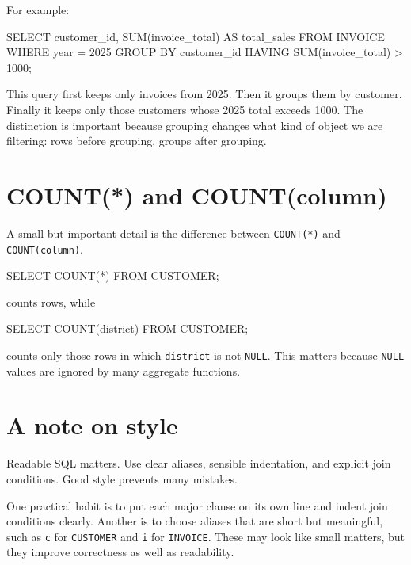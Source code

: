 \documentclass[11pt,a4paper,openany]{book}
\begin{document}
For example:

\begin{codesql}
SELECT customer_id, SUM(invoice_total) AS total_sales
FROM INVOICE
WHERE year = 2025
GROUP BY customer_id
HAVING SUM(invoice_total) > 1000;
\end{codesql}

This query first keeps only invoices from 2025. Then it groups them by customer. Finally it keeps only those customers whose 2025 total exceeds 1000. The distinction is important because grouping changes what kind of object we are filtering: rows before grouping, groups after grouping.

\section{COUNT(*) and COUNT(column)}
A small but important detail is the difference between \texttt{COUNT(*)} and \texttt{COUNT(column)}.

\begin{codesql}
SELECT COUNT(*)
FROM CUSTOMER;
\end{codesql}

counts rows, while

\begin{codesql}
SELECT COUNT(district)
FROM CUSTOMER;
\end{codesql}

counts only those rows in which \texttt{district} is not \texttt{NULL}. This matters because \texttt{NULL} values are ignored by many aggregate functions.

\section{A note on style}
Readable SQL matters. Use clear aliases, sensible indentation, and explicit join conditions. Good style prevents many mistakes.

One practical habit is to put each major clause on its own line and indent join conditions clearly. Another is to choose aliases that are short but meaningful, such as \texttt{c} for \texttt{CUSTOMER} and \texttt{i} for \texttt{INVOICE}. These may look like small matters, but they improve correctness as well as readability.
\end{document}
